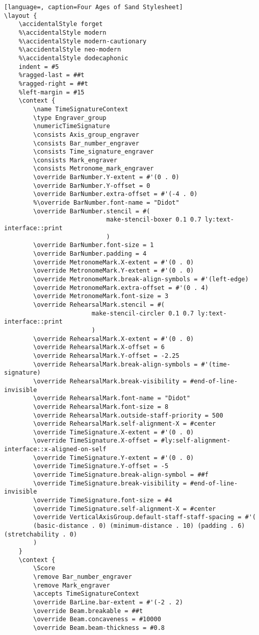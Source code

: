 \begin{lstlisting}[language=, caption=Four Ages of Sand Stylesheet]
\layout {
    \accidentalStyle forget
	%\accidentalStyle modern
	%\accidentalStyle modern-cautionary
	%\accidentalStyle neo-modern
	%\accidentalStyle dodecaphonic
    indent = #5
	%ragged-last = ##t
    %ragged-right = ##t
    %left-margin = #15
	\context {
        \name TimeSignatureContext
        \type Engraver_group
        \numericTimeSignature
        \consists Axis_group_engraver
		\consists Bar_number_engraver
        \consists Time_signature_engraver
		\consists Mark_engraver
		\consists Metronome_mark_engraver
		\override BarNumber.Y-extent = #'(0 . 0)
		\override BarNumber.Y-offset = 0
		\override BarNumber.extra-offset = #'(-4 . 0)
		%\override BarNumber.font-name = "Didot"
		\override BarNumber.stencil = #(
							make-stencil-boxer 0.1 0.7 ly:text-interface::print
							)
		\override BarNumber.font-size = 1
		\override BarNumber.padding = 4
		\override MetronomeMark.X-extent = #'(0 . 0)
		\override MetronomeMark.Y-extent = #'(0 . 0)
		\override MetronomeMark.break-align-symbols = #'(left-edge)
		\override MetronomeMark.extra-offset = #'(0 . 4)
		\override MetronomeMark.font-size = 3
		\override RehearsalMark.stencil = #(
						make-stencil-circler 0.1 0.7 ly:text-interface::print
						)
		\override RehearsalMark.X-extent = #'(0 . 0)
		\override RehearsalMark.X-offset = 6
		\override RehearsalMark.Y-offset = -2.25
		\override RehearsalMark.break-align-symbols = #'(time-signature)
		\override RehearsalMark.break-visibility = #end-of-line-invisible
		\override RehearsalMark.font-name = "Didot"
		\override RehearsalMark.font-size = 8
		\override RehearsalMark.outside-staff-priority = 500
		\override RehearsalMark.self-alignment-X = #center
        \override TimeSignature.X-extent = #'(0 . 0)
        \override TimeSignature.X-offset = #ly:self-alignment-interface::x-aligned-on-self
        \override TimeSignature.Y-extent = #'(0 . 0)
		\override TimeSignature.Y-offset = -5
        \override TimeSignature.break-align-symbol = ##f
        \override TimeSignature.break-visibility = #end-of-line-invisible
        \override TimeSignature.font-size = #4
        \override TimeSignature.self-alignment-X = #center
        \override VerticalAxisGroup.default-staff-staff-spacing = #'(
		(basic-distance . 0) (minimum-distance . 10) (padding . 6) (stretchability . 0)
		)
    }
    \context {
        \Score
        \remove Bar_number_engraver
		\remove Mark_engraver
        \accepts TimeSignatureContext
		\override BarLine.bar-extent = #'(-2 . 2)
        \override Beam.breakable = ##t
		\override Beam.concaveness = #10000
        \override Beam.beam-thickness = #0.8

\end{lstlisting}
